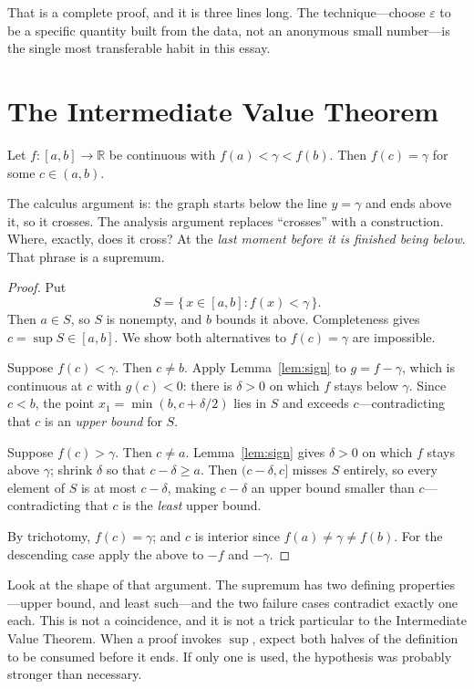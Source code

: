 \documentclass{essay}
\begin{document}
That is a complete proof, and it is three lines long. The technique---choose \(\varepsilon\) to be a specific quantity built from the data, not an anonymous small number---is the single most transferable habit in this essay.

\section{The Intermediate Value Theorem}

\begin{theorem}\label{thm:ivt}
  Let \(f : [a,b] \to \mathbb{R}\) be continuous with \(f(a) < \gamma < f(b)\). Then \(f(c) = \gamma\) for some \(c \in (a,b)\).
\end{theorem}

The calculus argument is: the graph starts below the line \(y = \gamma\) and ends above it, so it crosses. The analysis argument replaces ``crosses'' with a construction. Where, exactly, does it cross? At the \emph{last moment before it is finished being below}. That phrase is a supremum.

\begin{proof}
  Put
  \[ S = \{\, x \in [a,b] : f(x) < \gamma \,\}. \]
  Then \(a \in S\), so \(S\) is nonempty, and \(b\) bounds it above. Completeness gives \(c = \sup S \in [a,b]\). We show both alternatives to \(f(c) = \gamma\) are impossible.

  Suppose \(f(c) < \gamma\). Then \(c \neq b\). Apply Lemma~\ref{lem:sign} to \(g = f - \gamma\), which is continuous at \(c\) with \(g(c) < 0\): there is \(\delta > 0\) on which \(f\) stays below \(\gamma\). Since \(c < b\), the point \(x_{1} = \min(b, c + \delta/2)\) lies in \(S\) and exceeds \(c\)---contradicting that \(c\) is an \emph{upper bound} for \(S\).

  Suppose \(f(c) > \gamma\). Then \(c \neq a\). Lemma~\ref{lem:sign} gives \(\delta > 0\) on which \(f\) stays above \(\gamma\); shrink \(\delta\) so that \(c - \delta \geq a\). Then \((c - \delta, c]\) misses \(S\) entirely, so every element of \(S\) is at most \(c - \delta\), making \(c - \delta\) an upper bound smaller than \(c\)---contradicting that \(c\) is the \emph{least} upper bound.

  By trichotomy, \(f(c) = \gamma\); and \(c\) is interior since \(f(a) \neq \gamma \neq f(b)\). For the descending case apply the above to \(-f\) and \(-\gamma\).
\end{proof}

Look at the shape of that argument. The supremum has two defining properties---upper bound, and least such---and the two failure cases contradict exactly one each. This is not a coincidence, and it is not a trick particular to the Intermediate Value Theorem. When a proof invokes \(\sup\), expect both halves of the definition to be consumed before it ends. If only one is used, the hypothesis was probably stronger than necessary.
\end{document}
